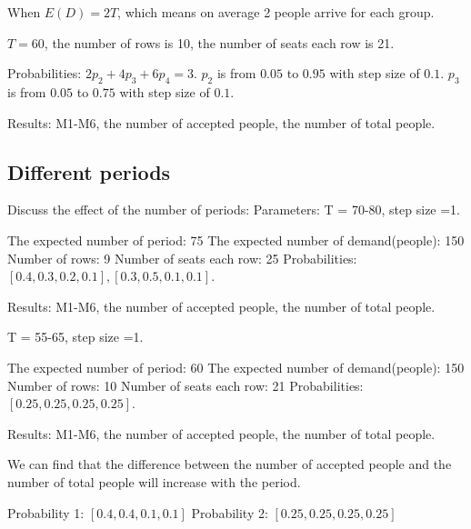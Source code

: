 % 

When $E(D) = 2T$, which means on average 2 people arrive for each group.

$T = 60$, the number of rows is 10, the number of seats each row is 21.

Probabilities: 
$2p_2 + 4p_3 + 6p_4 =3$. $p_2$ is from $0.05$ to $0.95$ with step size of $0.1$. $p_3$ is from $0.05$ to $0.75$ with step size of $0.1$.

Results: M1-M6, the number of accepted people, the number of total people.

% 

\subsection{Different periods}
Discuss the effect of the number of periods: 
Parameters: T = 70-80, step size =1.

The expected number of period: 75
The expected number of demand(people): 150
Number of rows: 9
Number of seats each row: 25
Probabilities: $[0.4, 0.3, 0.2, 0.1], [0.3, 0.5, 0.1, 0.1]$.

Results: M1-M6, the number of accepted people, the number of total people.

% 

% 

T = 55-65, step size =1.

The expected number of period: 60
The expected number of demand(people): 150
Number of rows: 10
Number of seats each row: 21
Probabilities: $[0.25, 0.25, 0.25, 0.25]$.

Results: M1-M6, the number of accepted people, the number of total people.

We can find that the difference between the number of accepted people and the number of total people will increase with the period. 

Probability 1: $[0.4, 0.4, 0.1, 0.1]$
Probability 2: $[0.25, 0.25, 0.25, 0.25]$

